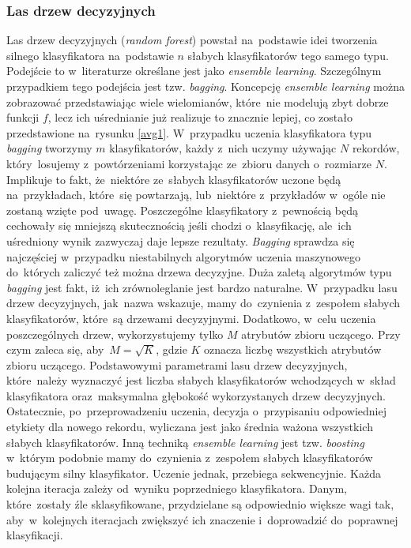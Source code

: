 \subsubsection{Las drzew decyzyjnych}
Las drzew decyzyjnych (\textit{random forest}) powstał na~podstawie idei tworzenia silnego klasyfikatora na~podstawie $n$ słabych klasyfikatorów tego samego typu. Podejście to w~literaturze określane jest jako \textit{ensemble learning}. Szczególnym przypadkiem tego podejścia jest tzw. \textit{bagging}\cite{gonczarek}. Koncepcję \textit{ensemble learning} można zobrazować przedstawiając wiele wielomianów, które~nie modelują zbyt dobrze funkcji $f$, lecz ich uśrednianie już realizuje to znacznie lepiej, co zostało przedstawione na~rysunku \ref{avg1}.  W~przypadku uczenia klasyfikatora typu \textit{bagging} tworzymy $m$ klasyfikatorów, każdy z~nich uczymy używając $N$ rekordów, który~losujemy z~powtórzeniami korzystając ze~zbioru danych o~rozmiarze $N$. Implikuje to fakt, że~niektóre ze~słabych klasyfikatorów uczone będą na~przykładach, które~się powtarzają, lub~niektóre z~przykładów w~ogóle nie zostaną wzięte pod~uwagę. Poszczególne klasyfikatory z~pewnością będą cechowały się mniejszą skutecznością jeśli chodzi o~klasyfikację, ale~ich uśredniony wynik zazwyczaj daje lepsze rezultaty. \textit{Bagging} sprawdza się najczęściej w~przypadku niestabilnych algorytmów uczenia maszynowego do~których zaliczyć też można drzewa decyzyjne\cite{ensemble}. Duża zaletą algorytmów typu \textit{bagging} jest fakt, iż~ich zrównoleglanie jest bardzo naturalne.
W~przypadku lasu drzew decyzyjnych, jak~nazwa wskazuje, mamy do~czynienia z~zespołem słabych klasyfikatorów, które~są drzewami decyzyjnymi. Dodatkowo, w~celu uczenia poszczególnych drzew, wykorzystujemy tylko $M$ atrybutów zbioru uczącego. Przy czym zaleca się, aby~$M=\sqrt{K}$, gdzie $K$ oznacza liczbę wszystkich atrybutów zbioru uczącego. Podstawowymi parametrami lasu drzew decyzyjnych, które~należy wyznaczyć jest liczba słabych klasyfikatorów wchodzących w~skład klasyfikatora oraz~maksymalna głębokość wykorzystanych drzew decyzyjnych. Ostatecznie, po~przeprowadzeniu uczenia, decyzja o~przypisaniu odpowiedniej etykiety dla nowego rekordu, wyliczana jest jako średnia ważona wszystkich słabych klasyfikatorów. Inną techniką \textit{ensemble learning} jest tzw. \textit{boosting}\cite{drucker1996boosting} w~którym podobnie mamy do~czynienia z~zespołem słabych klasyfikatorów budującym silny klasyfikator. Uczenie jednak, przebiega sekwencyjnie. Każda kolejna iteracja zależy od~wyniku poprzedniego klasyfikatora. Danym, które~zostały źle sklasyfikowane, przydzielane są odpowiednio większe wagi tak, aby~w~kolejnych iteracjach zwiększyć ich znaczenie i~doprowadzić do~poprawnej klasyfikacji.

